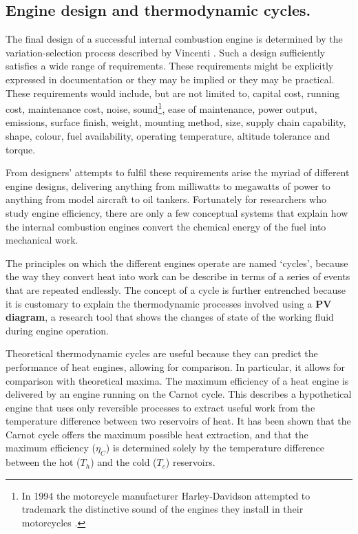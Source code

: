 \subsection{Engine design and thermodynamic cycles.} \label{par:efficiency}

The final design of a successful internal combustion engine is determined by the
variation-selection process described by Vincenti \autocite{Vincenti1990}. Such
a design sufficiently satisfies a wide range of requirements. These requirements
might be explicitly expressed in documentation or they may be implied or they
may be practical. These requirements would include, but are not limited to,
capital cost, running cost, maintenance cost, noise, sound\footnote{In 1994 the
motorcycle manufacturer Harley-Davidson attempted to trademark the distinctive
sound of the engines they install in their motorcycles \autocite{ODell2000}.},
ease of maintenance, power output, emissions, surface finish, weight, mounting
method, size, supply chain capability, shape, colour, fuel availability,
operating temperature, altitude tolerance and torque.

From designers' attempts to fulfil these requirements arise the myriad of
different engine designs, delivering anything from milliwatts to megawatts of
power to anything from model aircraft to oil tankers. Fortunately for
researchers who study engine efficiency, there are only a few conceptual systems
that explain how the internal combustion engines convert the chemical energy of
the fuel into mechanical work.

The principles on which the different engines operate are named `cycles',
because the way they convert heat into work can be describe in terms of a series
of events that are repeated endlessly. The concept of a cycle is further
entrenched because it is customary to explain the thermodynamic processes
involved using a \textbf{PV diagram}, a research tool that shows the changes of
state of the working fluid during engine operation.

Theoretical thermodynamic cycles are useful because they can predict the
performance of heat engines, allowing for comparison. In particular, it allows
for comparison with theoretical maxima. The maximum efficiency of a heat engine
is delivered by an engine running on the Carnot cycle. This describes a
hypothetical engine that uses only reversible processes to extract useful work
from the temperature difference between two reservoirs of heat. It has been
shown that the Carnot cycle offers the maximum possible heat extraction, and
that the maximum efficiency (\(\eta_{C}\)) is determined solely by the temperature
difference between the hot (\(T_h\)) and the cold (\(T_c\)) reservoirs.

